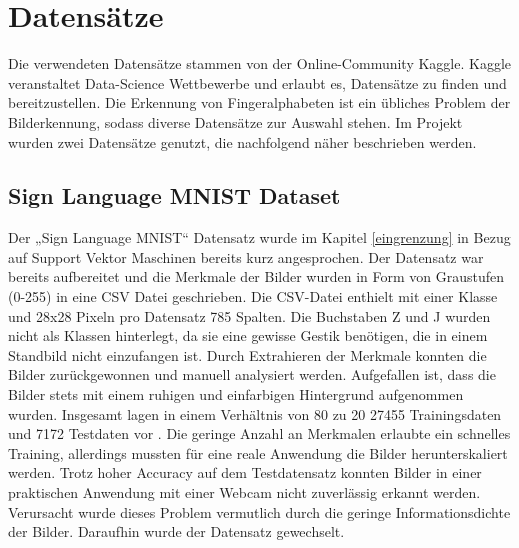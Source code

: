 \documentclass[11pt,bibliography=totocnumbered]{scrartcl}
\begin{document}
\section{Datensätze}
Die verwendeten Datensätze stammen von der Online-Community Kaggle. Kaggle veranstaltet Data-Science Wettbewerbe und erlaubt es, Datensätze zu finden und bereitzustellen. Die Erkennung von Fingeralphabeten ist ein übliches Problem der Bilderkennung, sodass diverse Datensätze zur Auswahl stehen. Im Projekt wurden zwei Datensätze genutzt, die nachfolgend näher beschrieben werden.
\subsection{Sign Language MNIST Dataset}
Der „Sign Language MNIST“ Datensatz wurde im Kapitel \ref{eingrenzung} in Bezug auf Support Vektor Maschinen bereits kurz angesprochen. Der Datensatz war bereits aufbereitet und die Merkmale der Bilder wurden in Form von Graustufen (0-255) in eine CSV Datei geschrieben. Die CSV-Datei enthielt mit einer Klasse und 28x28 Pixeln pro Datensatz 785 Spalten. Die Buchstaben Z und J wurden nicht als Klassen hinterlegt, da sie eine gewisse Gestik benötigen, die in einem Standbild nicht einzufangen ist. Durch Extrahieren der Merkmale konnten die Bilder zurückgewonnen und manuell analysiert werden. Aufgefallen ist, dass die Bilder stets mit einem ruhigen und einfarbigen Hintergrund aufgenommen wurden. Insgesamt lagen in einem Verhältnis von 80 zu 20 27455 Trainingsdaten und 7172 Testdaten vor \cite{SIGNMNIST}. Die geringe Anzahl an Merkmalen erlaubte ein schnelles Training, allerdings mussten für eine reale Anwendung die Bilder herunterskaliert werden. Trotz hoher Accuracy auf dem Testdatensatz konnten Bilder in einer praktischen Anwendung mit einer Webcam nicht zuverlässig erkannt werden. Verursacht wurde dieses Problem vermutlich durch die geringe Informationsdichte der Bilder. Daraufhin wurde der Datensatz gewechselt. 
\end{document}
